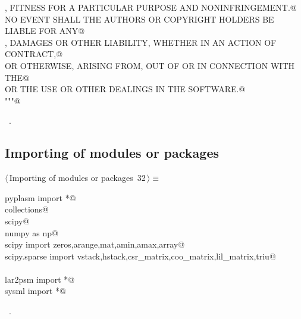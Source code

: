 \documentclass[11pt,oneside]{article}	%
\begin{document}
\begin{flushleft}
\begin{list}{}{}
\mbox{}\verb@MERCHANTABILITY, FITNESS FOR A PARTICULAR PURPOSE AND NONINFRINGEMENT.@\\
\mbox{}\verb@IN NO EVENT SHALL THE AUTHORS OR COPYRIGHT HOLDERS BE LIABLE FOR ANY@\\
\mbox{}\verb@CLAIM, DAMAGES OR OTHER LIABILITY, WHETHER IN AN ACTION OF CONTRACT,@\\
\mbox{}\verb@TORT OR OTHERWISE, ARISING FROM, OUT OF OR IN CONNECTION WITH THE@\\
\mbox{}\verb@SOFTWARE OR THE USE OR OTHER DEALINGS IN THE SOFTWARE.@\\
\mbox{}\verb@"""@\\
\mbox{}\verb@@{\NWsep}
\end{list}
\vspace{-1ex}
\footnotesize\addtolength{\baselineskip}{-1ex}
\begin{list}{}{\setlength{\itemsep}{-\parsep}\setlength{\itemindent}{-\leftmargin}}
\item \NWtxtMacroRefIn\ .
\end{list}
\end{flushleft}
\subsection{Importing of modules or packages}
\begin{flushleft} \small \label{scrap55}
\protect{}$\langle\,$Importing of modules or packages\nobreak\ {\footnotesize 32}$\,\rangle\equiv$
\vspace{-1ex}
\begin{list}{}{} \item
\mbox{}\verb@from pyplasm import *@\\
\mbox{}\verb@import collections@\\
\mbox{}\verb@import scipy@\\
\mbox{}\verb@import numpy as np@\\
\mbox{}\verb@from scipy import zeros,arange,mat,amin,amax,array@\\
\mbox{}\verb@from scipy.sparse import vstack,hstack,csr_matrix,coo_matrix,lil_matrix,triu@\\
\mbox{}\verb@@\\
\mbox{}\verb@from lar2psm import *@\\
\mbox{}\verb@from sysml import *@\\
\mbox{}\verb@@{\NWsep}
\end{list}
\vspace{-1ex}
\footnotesize\addtolength{\baselineskip}{-1ex}
\begin{list}{}{\setlength{\itemsep}{-\parsep}\setlength{\itemindent}{-\leftmargin}}
\item \NWtxtMacroRefIn\ .
\end{list}
\end{flushleft}
\end{document}
